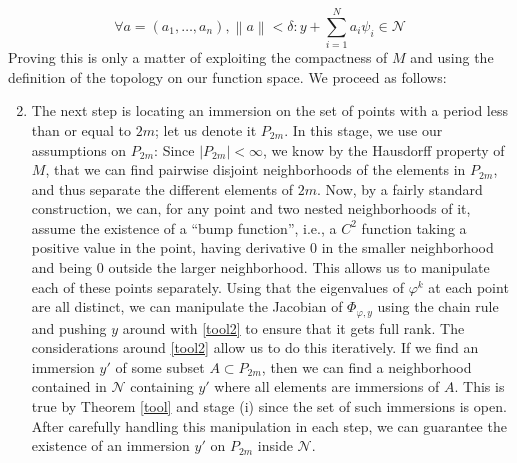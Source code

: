 \documentclass[11pt, a4paper]{memoir}
\theoremstyle{break}
\theoremstyle{break}
\theoremstyle{nonumberplain}
\newcommand{\norm}[1]{\left\lVert#1\right\rVert}
\begin{document}
\begin{equation}\label{tool2}
\forall a=(a_1,\ldots,a_n),\norm{a}< \delta: y+\sum_{i=1}^N a_i\psi_i\in \mathcal{N}
\end{equation}
Proving this is only a matter of exploiting the compactness of $M$ and using the definition of the topology on our function space. We proceed as follows:
\begin{enumerate}[label=(\roman*)]
	\setcounter{enumi}{1}
	\item The next step is locating an immersion on the set of points with a period less than or equal to $2m$; let us denote it $P_{2m}$. In this stage, we use our assumptions on $P_{2m}$: Since $|P_{2m}|<\infty$, we know by the Hausdorff property of $M$, that we can find pairwise disjoint neighborhoods of the elements in $P_{2m}$, and thus separate the different elements of $2m$. Now, by a fairly standard construction, we can, for any point and two nested neighborhoods of it, assume the existence of a \enquote{bump function}, i.e., a $C^2$ function taking a positive value in the point, having derivative 0 in the smaller neighborhood and being 0 outside the larger neighborhood. This allows us to manipulate each of these points separately. Using that the eigenvalues of $\varphi^k$ at each point are all distinct, we can manipulate the Jacobian of $\Phi_{\varphi,y}$ using the chain rule and pushing $y$ around with \ref{tool2} to ensure that it gets full rank. The considerations around \ref{tool2} allow us to do this iteratively. If we find an immersion $y'$ of some subset $A\subset P_{2m}$, then we can find a neighborhood contained in $\mathcal{N}$ containing $y'$ where all elements are immersions of $A$. This is true by Theorem \ref{tool} and stage (i) since the set of such immersions is open. After carefully handling this manipulation in each step, we can guarantee the existence of an immersion $y'$ on $P_{2m}$ inside $\mathcal{N}$.

\end{enumerate}
\end{document}
